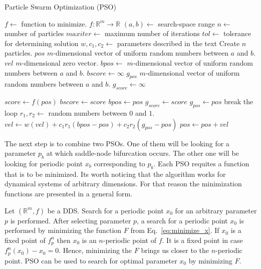 \begin{algorithm}[!h]
    \caption{Particle Swarm Optimization (PSO)}
    \label{alg:pso}
    \begin{algorithmic}[1]
        \Statex $f \gets$ function to minimize. $f: \mathbb{R}^{m} \rightarrow \mathbb{R}$  
        \Statex $(a, b) \gets$ search-space range
        \Statex $n \gets$ number of particles
        \Statex $maxiter \gets$ maximum number of iterations
        \Statex $tol \gets$ tolerance for determining solution
        \Statex $w, c_{1}, c_{2} \gets$ parameters described in the text
        \State Create $n$ particles.
            \State $pos$ $m$-dimensional vector of uniform random numbers between $a$ and $b$.
            \State $vel$ $m$-dimensional zero vector.
            \State $bpos \gets$ $m$-dimensional vector of uniform random numbers between $a$ and $b$.
            \State $bscore \gets \infty$
        \EndFor
        \State $g_{pos}$ $m$-dimensional vector of uniform random numbers between $a$ and $b$.
        \State $g_{score} \gets \infty$

                \State $score \gets f(pos)$ 
                    \State $bscore \gets score$
                    \State $bpos \gets pos$
                \EndIf
                    \State $g_{score} \gets score$
                    \State $g_{pos} \gets pos$
                \EndIf
            \EndFor
                \State break the loop
            \EndIf
                \State $r_{1}, r_{2} \gets$ random numbers between $0$ and $1$.
                \State $vel \gets w(vel) + c_{1}r_{1}(bpos-pos) + c_{2}r_{2}(g_{pos}-pos)$
                \State $pos \gets pos + vel$
            \EndFor
        \EndFor
    \end{algorithmic}
\end{algorithm}

\par
The next step is to combine two PSOs.
One of them will be looking for a parameter $p_b$ at which saddle-node bifurcation occurs.
The other one will be looking for periodic point $x_b$ corresponding to $p_b$.
Each PSO requites a function that is to be minimized.
Its worth noticing that the algorithm works for dynamical systems of arbitrary dimensions.
For that reason the minimization functions are presented in a general form.
\par
Let $(\mathbb{R}^{m}, f)$ be a DDS.
Search for a periodic point $x_0$ for an arbitrary parameter $p$ is performed.
After selecting parameter $p$, a search for a periodic point $x_0$ is performed by minimizing the function $F$ from Eq.~\ref{eq:minimize_x}.
If $x_0$ is a fixed point of $f^{n}_{p}$ then $x_0$ is an $n$-periodic point of $f$.
It is a fixed point in case $f^{n}_{p}(x_0)-x_0 = 0$.
Hence, minimizing the $F$ brings us closer to the $n$-periodic point.
PSO can be used to search for optimal parameter $x_0$ by minimizing $F$.


